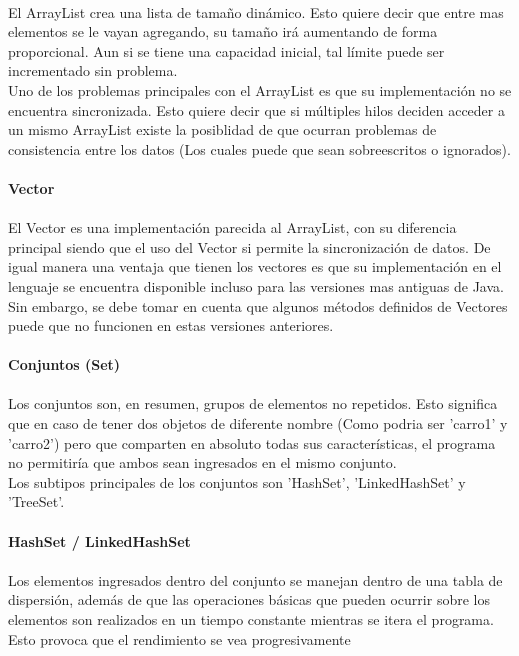 \documentclass{article}
\begin{document}
	\\
	\normalsize El ArrayList crea una lista de tamaño dinámico. Esto quiere decir que entre mas elementos se le vayan agregando, su tamaño irá aumentando de forma proporcional. Aun si se tiene una capacidad inicial, tal límite puede ser incrementado sin problema.
	\\
	Uno de los problemas principales con el ArrayList es que su implementación no se encuentra sincronizada. Esto quiere decir que si múltiples hilos deciden acceder a un mismo ArrayList existe la posiblidad de que ocurran problemas de consistencia entre los datos (Los cuales puede que
	sean sobreescritos o ignorados).
	\\
	\\
	\large \textbf{Vector}
	\\
	\\
	\normalsize El Vector es una implementación parecida al ArrayList, con su diferencia principal siendo que el uso del Vector si permite la sincronización de datos. De igual manera una ventaja que tienen los vectores es que su implementación en el lenguaje se encuentra disponible
	incluso para las versiones mas antiguas de Java. 
	\\
	Sin embargo, se debe tomar en cuenta que algunos métodos definidos de Vectores puede que no funcionen en estas versiones anteriores.
	\\
	\\
	\Large \textbf{Conjuntos (Set)}
	\\
	\\
	\normalsize Los conjuntos son, en resumen, grupos de elementos no repetidos. Esto significa que en caso de tener dos objetos de diferente nombre (Como podria ser 'carro1' y 'carro2') pero que comparten en absoluto todas sus características, el programa no permitiría que ambos sean 
	ingresados en el mismo conjunto.
	\\
	Los subtipos principales de los conjuntos son 'HashSet', 'LinkedHashSet' y 'TreeSet'.
	\\
	\\
	\large \textbf{HashSet / LinkedHashSet}
	\\
	\\
	\normalsize Los elementos ingresados dentro del conjunto se manejan dentro de una tabla de dispersión, además de que las operaciones básicas que pueden ocurrir sobre los elementos son realizados en un tiempo constante mientras se itera el programa. 
	\\
	Esto provoca que el rendimiento se vea progresivamente
\end{document}
